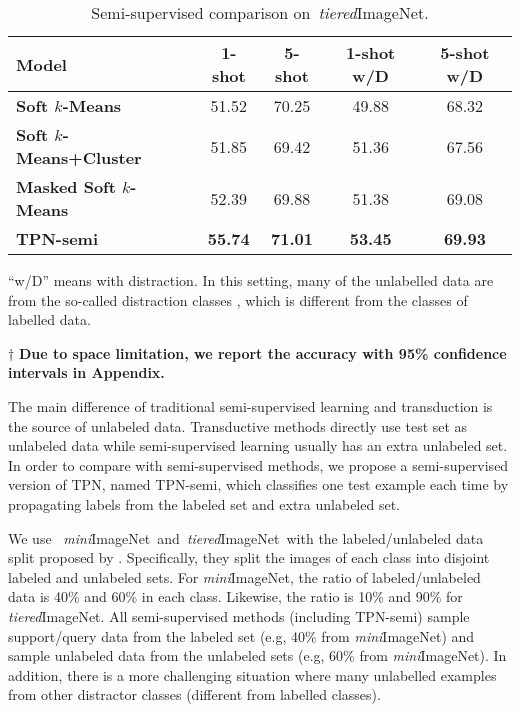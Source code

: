 \documentclass{article} \usepackage{iclr2019_conference,times}
\def\mini{{\textit{mini}ImageNet}}
\def\tiered{{\textit{tiered}ImageNet}}
\begin{document}
\begin{table}[ht]
\centering
\begin{threeparttable}
\small
\caption{Semi-supervised comparison on~\tiered.}
\label{semi-tiered}
\begin{tabular}{lcccc}
\hline
Model                            						 & \multicolumn{1}{c}{1-shot} & \multicolumn{1}{c}{5-shot} & \multicolumn{1}{c}{1-shot w/D} & \multicolumn{1}{c}{5-shot w/D} \\ \hline
\textbf{Soft $k$-Means~\citep{semi-proto}}          & 51.52 & 70.25 & 49.88 & 68.32\\
\textbf{Soft $k$-Means+Cluster~\citep{semi-proto}}  & 51.85 & 69.42 & 51.36 & 67.56\\
\textbf{Masked Soft $k$-Means~\citep{semi-proto}}   & 52.39 & 69.88 & 51.38 & 69.08\\ \hline
\textbf{TPN-semi}                                   & \textbf{55.74} & \textbf{71.01} & \textbf{53.45} & \textbf{69.93}\\ \hline
\end{tabular}
\begin{tablenotes}
  	\item * ``w/D'' means with distraction. In this setting, many of the unlabelled data are from the so-called distraction classes , which is different from the classes of labelled data.
  	\item $\dagger$ \textbf{Due to space limitation, we report the accuracy with 95\% confidence intervals in Appendix.}
\end{tablenotes} 
\end{threeparttable}
\end{table}

The main difference of traditional semi-supervised learning and transduction is the source of unlabeled data. Transductive methods directly use test set as unlabeled data while semi-supervised learning usually has an extra unlabeled set. In order to compare with semi-supervised methods, we propose a semi-supervised version of TPN, named TPN-semi, which classifies one test example each time by propagating labels from the labeled set and extra unlabeled set. 

We use ~\mini~and~\tiered~with the labeled/unlabeled data split proposed by \cite{semi-proto}. Specifically, they split the images of each class into disjoint labeled and unlabeled sets. For \mini, the ratio of labeled/unlabeled data is 40\% and 60\% in each class. Likewise,  the ratio is 10\% and 90\% for \tiered. All semi-supervised methods (including TPN-semi) sample support/query data from the labeled set (e.g, 40\% from \mini) and sample unlabeled data from the unlabeled sets (e.g, 60\% from \mini). In addition, there is a more challenging situation where many unlabelled examples from other distractor classes (different from labelled classes). 
\end{document}
